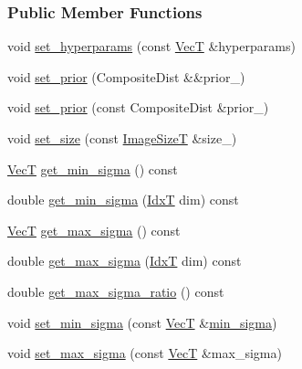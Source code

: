 \subsubsection*{Public Member Functions}
\begin{DoxyCompactItemize}
\item 
void \hyperlink{classmappel_1_1Gauss2DsModel_a615788e50f97d8c863ec60a5dfee07e3}{set\+\_\+hyperparams} (const \hyperlink{namespacemappel_a2225ad69f358daa3f4f99282a35b9a3a}{VecT} \&hyperparams)
\item 
void \hyperlink{classmappel_1_1Gauss2DsModel_a895bee95db23557189b58f9b1d5e2453}{set\+\_\+prior} (Composite\+Dist \&\&prior\+\_\+)
\item 
void \hyperlink{classmappel_1_1Gauss2DsModel_a440d1378a1b99f2b299a33644d894a57}{set\+\_\+prior} (const Composite\+Dist \&prior\+\_\+)
\item 
void \hyperlink{classmappel_1_1Gauss2DsModel_a4a95f8c149bd5881e01af5207e30e2e9}{set\+\_\+size} (const \hyperlink{classmappel_1_1ImageFormat2DBase_a49cccf61eb2a768a202634d27fcd81d5}{Image\+SizeT} \&size\+\_\+)
\item 
\hyperlink{namespacemappel_a2225ad69f358daa3f4f99282a35b9a3a}{VecT} \hyperlink{classmappel_1_1Gauss2DsModel_af93a5f984a97e23ae1d371c980e48a41}{get\+\_\+min\+\_\+sigma} () const 
\item 
double \hyperlink{classmappel_1_1Gauss2DsModel_abc315bd2db4fc654348a63aaaa1f3df2}{get\+\_\+min\+\_\+sigma} (\hyperlink{namespacemappel_ab17ec0f30b61ece292439d7ece81d3a8}{IdxT} dim) const 
\item 
\hyperlink{namespacemappel_a2225ad69f358daa3f4f99282a35b9a3a}{VecT} \hyperlink{classmappel_1_1Gauss2DsModel_a11f03c648095b6d7dd5c38c3a5eca2dc}{get\+\_\+max\+\_\+sigma} () const 
\item 
double \hyperlink{classmappel_1_1Gauss2DsModel_a66f4ff2b408413df0487bc18d11ca15c}{get\+\_\+max\+\_\+sigma} (\hyperlink{namespacemappel_ab17ec0f30b61ece292439d7ece81d3a8}{IdxT} dim) const 
\item 
double \hyperlink{classmappel_1_1Gauss2DsModel_a46da2752c2d1ca376b72d910818e47ae}{get\+\_\+max\+\_\+sigma\+\_\+ratio} () const 
\item 
void \hyperlink{classmappel_1_1Gauss2DsModel_a63d3481174444ff7f7b603a47aa8dcc1}{set\+\_\+min\+\_\+sigma} (const \hyperlink{namespacemappel_a2225ad69f358daa3f4f99282a35b9a3a}{VecT} \&\hyperlink{classmappel_1_1Gauss2DsModel_a8a97d37d210c1d161e4bc32c3a7b20dc}{min\+\_\+sigma})
\item 
void \hyperlink{classmappel_1_1Gauss2DsModel_a8ef1bc0d4dc27247d88ff2c7300a149d}{set\+\_\+max\+\_\+sigma} (const \hyperlink{namespacemappel_a2225ad69f358daa3f4f99282a35b9a3a}{VecT} \&max\+\_\+sigma)

\end{DoxyCompactItemize}
